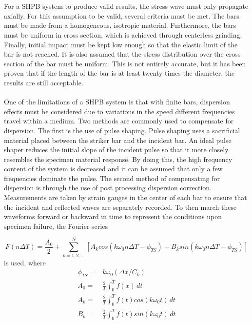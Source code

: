 \documentclass[12pt]{article}
\begin{document}
\\ \\
For a SHPB system to produce valid results, the stress wave must only propagate axially. For this assumption to be valid, several criteria must be met. The bars must be made from a homogeneous, isotropic material. Furthermore, the bars must be uniform in cross section, which is achieved through centerless grinding. Finally, initial impact must be kept low enough so that the elastic limit of the bar is not reached. It is also assumed that the stress distribution over the cross section of the bar must be uniform. This is not entirely accurate, but it has been proven that if the length of the bar is at least twenty times the diameter, the results are still acceptable. 
\\ \\
One of the limitations of a SHPB system is that with finite bars, dispersion effects must be considered due to variations in the speed different frequencies travel within a medium. Two methods are commonly used to compensate for dispersion. The first is the use of pulse shaping. Pulse shaping uses a sacrificial material placed between the striker bar and the incident bar. An ideal pulse shaper reduces the initial slope of the incident pulse so that it more closely resembles the specimen material response. By doing this, the high frequency content of the system is decreased and it can be assumed that only a few frequencies dominate the pulse. The second method of compensating for dispersion is through the use of post processing dispersion correction. Measurements are taken by strain gauges in the center of each bar to ensure that the incident and reflected waves are separately recorded. To then march these waveforms forward or backward in time to represent the conditions upon specimen failure, the Fourier series

\begin{equation}
F(n\Delta T) = \frac{A_0}{2} + \sum\limits_{k=1,2,...}^N [A_k cos(k \omega_0 n \Delta T - \phi_{TS}) + B_k sin(k\omega_0 n\Delta T - \phi_{TS})]
\end{equation}
is used, where 
\begin{align*}
\phi_{TS} =& k\omega_0(\Delta x/C_k) \\
A_0 =& \frac{2}{T} \int_0^T \! f(x) \, dt\\
A_k =& \frac{2}{T} \int_0^T \! f(t)cos(k\omega_0t) \, dt\\
B_k =& \frac{2}{T} \int_0^T \! f(t)sin(k\omega_0t) \, dt
\end{align*}
\end{document}

